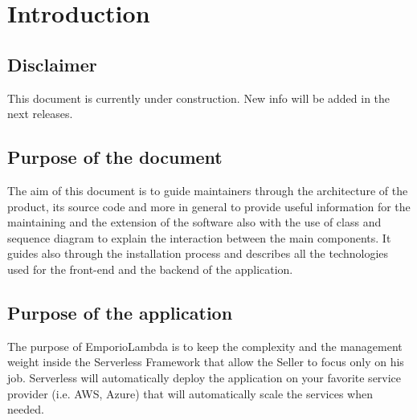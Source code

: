 \section{Introduction} \label{_introduction}
\subsection{Disclaimer}
This document is currently under construction. New info will be added in the next releases.

\subsection{Purpose of the document}
The aim of this document is to guide maintainers through the architecture of the product, its source code and more in general to provide useful information for the maintaining and the extension of the software also with the use of class and sequence diagram to explain the interaction between the main components. It guides also through the installation process and describes all the technologies used for the front-end and the backend of the application.

\subsection{Purpose of the application}
The purpose of EmporioLambda is to keep the complexity and the management weight inside the Serverless Framework that allow the Seller to focus only on his job. Serverless will automatically deploy the application on your favorite service provider (i.e. AWS, Azure) that will automatically scale the services when needed.